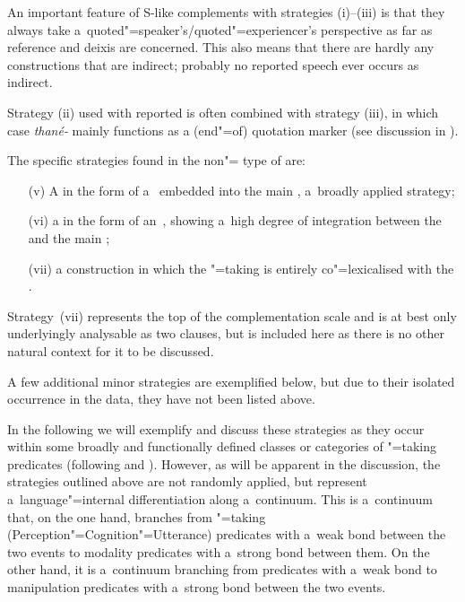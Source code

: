 An important feature of S-like complements with strategies (i)--(iii) is that they always take a~quoted"=speaker's/quoted"=experiencer's perspective as far as  reference and deixis are concerned. This also means that there are hardly any constructions that are indirect; probably no reported speech ever occurs as indirect.


Strategy (ii) used with reported  is often combined with strategy (iii), in which case \textit{thané-} mainly functions as a (end"=of) quotation marker (see discussion in ).


The specific strategies found in the non"= type of  are:

\begin{enumerate}
\item[(v)] A  in the form of a~ embedded into the main , a~broadly applied strategy;
\item[(vi)] a  in the form of an~, showing a~high degree of integration between the  and the main ;
\item[(vii)] a  construction in which the "=taking  is entirely co"=lexicalised with the .
\end{enumerate}
Strategy~(vii) represents the top of the complementation scale \citep[74]{givon2001b} and is at best only underlyingly analysable as two clauses, but is included here as there is no other natural context for it to be discussed.


A few additional minor strategies are exemplified below, but due to their isolated occurrence in the data, they have not been listed above.



In the following we will exemplify and discuss these strategies as they occur within some broadly and functionally defined classes or categories of "=taking predicates (following \citealt[40--59]{givon2001b} and \citealt[120--145]{noonan2007}). However, as will be apparent in the discussion, the strategies outlined above are not randomly applied, but represent a~language"=internal differentiation along a~continuum. This is a~continuum that, on the one hand, branches from "=taking  (Perception"=Cognition"=Utterance) predicates with a~weak bond between the two events to modality predicates with a~strong bond between them. On the other hand, it is a~continuum branching from  predicates with a~weak bond to manipulation predicates with a~strong bond between the two events.


